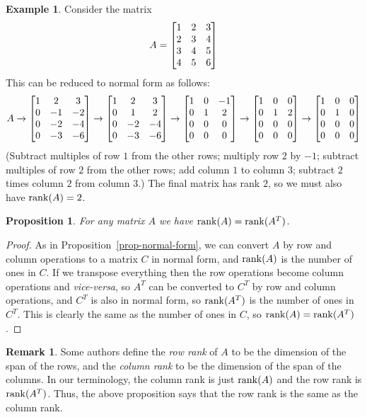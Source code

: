 \documentclass[reqno]{amsart}
\newtheorem{proposition}[theorem]{Proposition}
\theoremstyle{definition}
\newtheorem{remark}[theorem]{Remark}
\newtheorem{example}[theorem]{Example}
\newcommand{\dfn}[1]{\emph{{#1}}\index{#1}}
\begin{document}
\begin{example}\label{eg-normal-form-ii}
 Consider the matrix
 \[ A = \left[\begin{matrix} 1&2&3 \\ 2&3&4 \\ 3&4&5 \\ 4&5&6 \end{matrix}\right] \]
 This can be reduced to normal form as follows:
 \[ A \to
    \left[\begin{matrix} 1&2&3 \\ 0&-1&-2 \\ 0&-2&-4 \\ 0&-3&-6 \end{matrix}\right] 
    \to
    \left[\begin{matrix} 1&2&3 \\ 0&1&2 \\ 0&-2&-4 \\ 0&-3&-6 \end{matrix}\right] 
    \to
    \left[\begin{matrix} 1&0&-1 \\ 0&1&2 \\ 0&0&0 \\ 0&0&0 \end{matrix}\right]
    \to
    \left[\begin{matrix} 1&0&0 \\ 0&1&2 \\ 0&0&0 \\ 0&0&0 \end{matrix}\right]
    \to
    \left[\begin{matrix} 1&0&0 \\ 0&1&0 \\ 0&0&0 \\ 0&0&0 \end{matrix}\right]
 \]
 (Subtract multiples of row $1$ from the other rows; multiply row $2$
 by $-1$; subtract multiples of row $2$ from the other rows; add column
 $1$ to column $3$; subtract $2$ times column $2$ from column $3$.)
 The final matrix has rank $2$, so we must also have $\operatorname{rank}(A)=2$.
\end{example}

\begin{proposition}\label{prop-equal-rank}
 For any matrix $A$ we have $\operatorname{rank}(A)=\operatorname{rank}(A^T)$.
\end{proposition}
\begin{proof}
 As in Proposition~\ref{prop-normal-form}, we can convert $A$ by row
 and column operations to a matrix $C$ in normal form, and $\operatorname{rank}(A)$
 is the number of ones in $C$.  If we transpose everything then the
 row operations become column operations and \emph{vice-versa}, so
 $A^T$ can be converted to $C^T$ by row and column operations, and
 $C^T$ is also in normal form, so $\operatorname{rank}(A^T)$ is the number of ones in
 $C^T$.  This is clearly the same as the number of ones in $C$, so
 $\operatorname{rank}(A)=\operatorname{rank}(A^T)$.  
\end{proof}

\begin{remark}\label{rem-row-col-rank}
 Some authors define the \dfn{row rank} of $A$ to be the dimension of
 the span of the rows, and the \dfn{column rank} to be the dimension
 of the span of the columns.  In our terminology, the column rank is
 just $\operatorname{rank}(A)$ and the row rank is $\operatorname{rank}(A^T)$.  Thus, the above
 proposition says that the row rank is the same as the column rank.
\end{remark}
\end{document}
